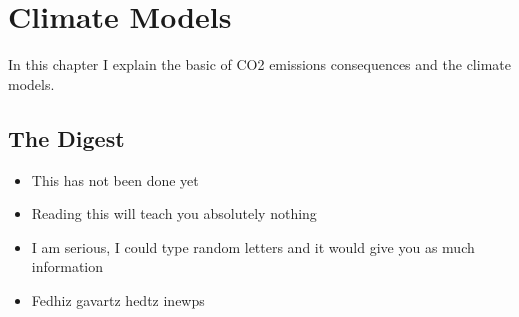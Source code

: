 \setchapterpreamble[u]{\margintoc}
\chapter{Climate Models}

In this chapter I explain the basic of CO2 emissions consequences and the climate models.


\blindtext


\section{The Digest}


\begin{kaoboxgreen}[frametitle=Main Takeaways]

\begin{itemize}
\item This has not been done yet
\item Reading this will teach you absolutely nothing
\item I am serious, I could type random letters and it would give you as much information
\item Fedhiz gavartz hedtz inewps
\end{itemize}
  
\end{kaoboxgreen}